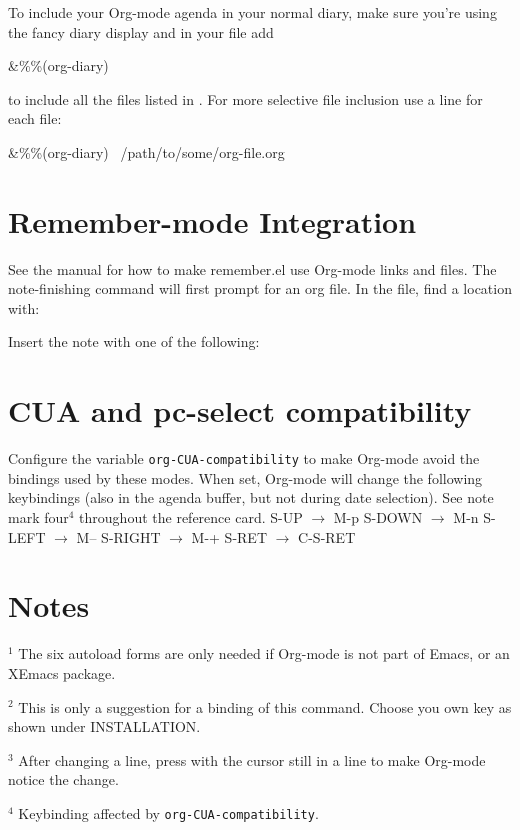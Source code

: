 To include your Org-mode agenda in your normal diary, make sure you're
using the fancy diary display
%
%
and in your  file add

\beginexample%
\&\%\%(org-diary)
\endexample

to include all the files listed in .  For more
selective file inclusion use a line for each file:

\beginexample%
\&\%\%(org-diary) ~/path/to/some/org-file.org
\endexample

\section{Remember-mode Integration}

See the manual for how to make remember.el use Org-mode links and
files.  The note-finishing command  will first prompt for
an org file. In the file, find a location with:


Insert the note with one of the following: 


\section{CUA and pc-select compatibility}

Configure the variable {\tt org-CUA-compatibility} to make Org-mode
avoid the  bindings used by these modes.  When set,
Org-mode will change the following keybindings (also in the agenda
buffer, but not during date selection). See note mark four$^4$
throughout the reference card.
\beginexample
S-UP    $\to$ M-p             S-DOWN  $\to$ M-n
S-LEFT  $\to$ M--             S-RIGHT $\to$ M-+
S-RET   $\to$ C-S-RET
\endexample

\section{Notes}
$^1$ The six autoload forms are only needed if Org-mode is not part of
Emacs, or an XEmacs package.

$^2$ This is only a suggestion for a binding of this command.  Choose
you own key as shown under INSTALLATION.

$^3$ After changing a  line, press  with
the cursor still in a line to make Org-mode notice the change.

$^4$ Keybinding affected by {\tt org-CUA-compatibility}.

\copyrightnotice

\bye

